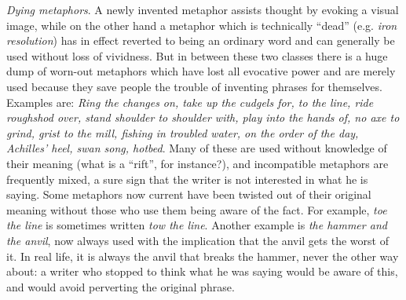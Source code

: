 \documentclass[a4paper]{article}
\begin{document}
\vspace{0.3cm}

\textit{Dying metaphors}. A newly invented metaphor assists thought by evoking a visual image, while on the other hand a metaphor which is technically ``dead'' (e.g. \textit{iron resolution}) has in effect reverted to being an ordinary word and can generally be used without loss of vividness. But in between these two classes there is a huge dump of worn-out metaphors which have lost all evocative power and are merely used because they save people the trouble of inventing phrases for themselves. Examples are: \textit{Ring the changes on, take up the cudgels for, to the line, ride roughshod over, stand shoulder to shoulder with, play into the hands of, no axe to grind, grist to the mill, fishing in troubled water, on the order of the day, Achilles' heel, swan song, hotbed}. Many of these are used without knowledge of their meaning (what is a ``rift'', for instance?), and incompatible metaphors are frequently mixed, a sure sign that the writer is not interested in what he is saying. Some metaphors now current have been twisted out of their original meaning without those who use them being aware of the fact. For example, \textit{toe the line} is sometimes written \textit{tow the line}. Another example is \textit{the hammer and the anvil}, now always used with the implication that the anvil gets the worst of it. In real life, it is always the anvil that breaks the hammer, never the other way about: a writer who stopped to think what he was saying would be aware of this, and would avoid perverting the original phrase.

\vspace{0.3cm}
\end{document}

